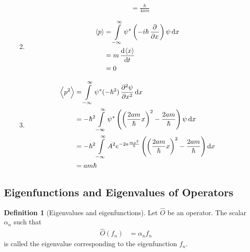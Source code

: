 \documentclass[titlepage, fleqn, a4paper, 12pt, twoside]{article}
\theoremstyle{definition}
\newtheorem{definition}{Definition}
\theoremstyle{theorem}
\let\Oldsubsection\subsection
\renewcommand{\subsection}{\FloatBarrier\Oldsubsection}
\begin{document}
\begin{solution}
\begin{enumerate}[leftmargin=*]
\begin{enumerate}[leftmargin=*]
\begin{align*}
{						}                                                                \\
                                                                                                                  & = \frac{\hbar}{4 a m}
					\end{align*}
				\item
					\begin{align*}
						\langle p \rangle & = \int\limits_{-\infty}^{\infty} \psi^* \left( -i \hbar \dpd{}{x} \right) \psi \dif x \\
                                                                  & = m \dod{\langle x \rangle}{t}                                                        \\
                                                                  & = 0
					\end{align*}
				\item
					\begin{align*}
						\left\langle p^2 \right\rangle & = \int\limits_{-\infty}^{\infty} \psi^* (-\hbar^2) \dpd[2]{\psi}{x} \dif x                                                                                    \\
                                                                               & = -\hbar^2 \int\limits_{-\infty}^{\infty} \psi^* \left( \left( \frac{2 a m}{\hbar} x \right)^2 - \frac{2 a m}{\hbar} \right) \psi \dif x                      \\
                                                                               & = -\hbar^2 \int\limits_{-\infty}^{\infty} A^2 e^{-2 a \frac{m x^2}{\hbar}} \left( \left( \frac{2 a m}{\hbar} x \right)^2 - \frac{2 a m}{\hbar} \right) \dif x \\
                                                                               & = a m \hbar
					\end{align*}
			\end{enumerate}
	\end{enumerate}
\end{solution}

\subsection{Eigenfunctions and Eigenvalues of Operators}

\begin{definition}[Eigenvalues and eigenfunctions]
	Let $\hat{O}$ be an operator.
	The scalar $\alpha_n$ such that
	\begin{align*}
		\hat{O}(f_n) &= \alpha_n f_n
	\end{align*}
	is called the eigenvalue corresponding to the eigenfunction $f_n$.
\end{definition}
\end{document}
